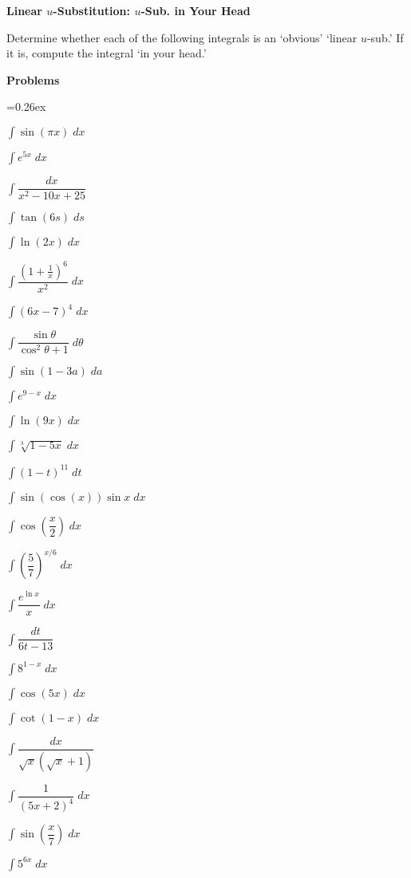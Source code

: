 \documentclass[11pt,letterpaper]{article}
\newcommand\ds{\displaystyle}
\newenvironment{3enumerate}{%
	\begin{enumerate}[(1)]
	\begin{multicols}{3}
	}{%
	\end{multicols}
	\end{enumerate}
}
\begin{document}

\begin{center} {\bfseries \LARGE Linear $u$-Substitution: $u$-Sub. in Your Head} \end{center} 

Determine whether each of the following integrals is an `obvious' `linear $u$-sub.' If it is, compute the integral `in your head.'

	\begin{center} {\bfseries\Large Problems} \end{center}
\begin{3enumerate} \itemsep=0.26ex
\item $\ds\int \sin(\pi x) \;dx$
\item $\ds\int e^{5x} \;dx$
\item $\ds\int \dfrac{dx}{x^2 - 10x + 25}$
\item $\ds\int \tan(6s) \;ds$
\item $\ds\int \ln(2x) \;dx$
\item $\ds\int \dfrac{\left(1 + \frac{1}{x} \right)^6}{x^2} \;dx$
\item $\ds\int (6x - 7)^4 \;dx$
\item $\ds\int \dfrac{\sin \theta}{\cos^2 \theta + 1} \;d\theta$
\item $\ds\int \sin(1 - 3a) \;da$
\item $\ds\int e^{9 - x} \;dx$
\item $\ds\int \ln(9x) \;dx$
\item $\ds\int \sqrt[3]{1 - 5x} \;dx$
\item $\ds\int (1 - t)^{11} \;dt$
\item $\ds\int \sin(\cos(x)) \sin x \;dx$
\item $\ds\int \cos\left( \dfrac{x}{2} \right) \;dx$
\item $\ds\int \left( \dfrac{5}{7} \right)^{x/6} \;dx$
\item $\ds\int \dfrac{e^{\ln x}}{x} \;dx$
\item $\ds\int \dfrac{dt}{6t - 13}$
\item $\ds\int 8^{1 - x} \;dx$
\item $\ds\int \cos(5x) \;dx$
\item $\ds\int \cot(1 - x) \;dx$
\item $\ds\int \dfrac{dx}{\sqrt{x} (\sqrt{x} + 1)}$
\item $\ds\int \dfrac{1}{(5x + 2)^4} \;dx$
\item $\ds\int \sin\left( \dfrac{x}{7} \right) \;dx$
\item $\ds\int 5^{6x} \;dx$

\end{3enumerate}
\end{document}
